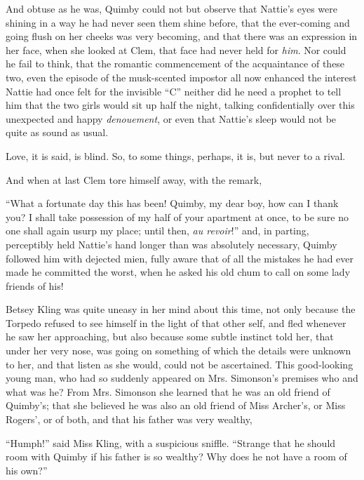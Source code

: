 And obtuse as he was, Quimby could not but observe that Nattie's eyes
were shining in a way he had never seen them shine before, that the
ever-coming and going flush on her cheeks was very becoming, and that
there was an expression in her face, when she looked at Clem, that face
had never held for \emph{him}. Nor could he fail to think, that the romantic
commencement of the acquaintance of these two, even the episode of the
musk-scented impostor all now enhanced the interest Nattie had once felt
for the invisible ``C'' neither did he need a prophet to tell him that the
two girls would sit up half the night, talking confidentially over this
unexpected and happy \emph{denouement}, or even that Nattie's sleep would not
be quite as sound as usual.

Love, it is said, is blind. So, to some things, perhaps, it is, but
never to a rival.

And when at last Clem tore himself away, with the remark,

``What a fortunate day this has been! Quimby, my dear boy, how can I
thank you? I shall take possession of my half of your apartment at once,
to be sure no one shall again usurp my place; until then, \emph{au revoir}!''
and, in parting, perceptibly held Nattie's hand longer than was
absolutely necessary, Quimby followed him with dejected mien, fully
aware that of all the mistakes he had ever made he committed the worst,
when he asked his old chum to call on some lady friends of his!








 Betsey Kling was quite uneasy in her mind about this time, not only
because the Torpedo refused to see himself in the light of that other
self, and fled whenever he saw her approaching, but also because some
subtle instinct told her, that under her very nose, was going on
something of which the details were unknown to her, and that listen as
she would, could not be ascertained. This good-looking young man, who
had so suddenly appeared on Mrs. Simonson's premises who and what was
he? From Mrs. Simonson she learned that he was an old friend of
Quimby's; that she believed he was also an old friend of Miss Archer's,
or Miss Rogers', or of both, and that his father was very wealthy,

``Humph!'' said Miss Kling, with a suspicious sniffle. ``Strange that he
should room with Quimby if his father is so wealthy? Why does he not
have a room of his own?''

